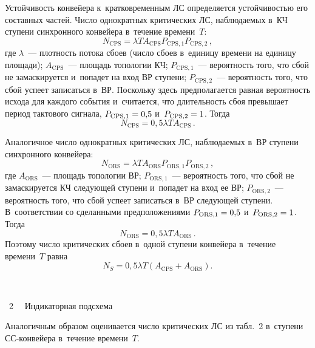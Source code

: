 \begin{multicols}{2}
  Устойчивость конвейера к~кратковременным ЛС определяется 
устойчивостью его составных частей. Число однократных критических ЛС, 
наблюдаемых в~КЧ ступени синхронного конвейера в~течение времени~$T$:
  $$
N_{\mathrm{CPS}} = \lambda T A_{\mathrm{CPS}} P_{\mathrm{CPS},1} P_{\mathrm{CPS},2}\,,
$$
где $\lambda$~--- плотность потока сбоев (число сбоев в~единицу времени на 
единицу площади); $A_{\mathrm{CPS}}$~--- площадь топологии КЧ; $P_{\mathrm{CPS},1}$~--- 
вероятность того, что сбой не замаскируется и~попадет на вход ВР ступени; 
$P_{\mathrm{CPS},2}$~--- вероятность того, что сбой успеет записаться в~ВР. Поскольку 
здесь предполагается равная вероятность исхода для каждого события 
и~считается, что длительность сбоя превышает период тактового сигнала, 
$P_{\mathrm{CPS},1}\hm = 0{,}5$ и~$P_{\mathrm{CPS},2}\hm = 1$. Тогда
$$
N_{\mathrm{CPS}} = 0{,}5\lambda TA_{\mathrm{CPS}}\,.
$$
  
  Аналогичное число однократных критических ЛС, наблюдаемых в~ВР 
ступени синхронного конвейера:
  $$
N_{\mathrm{ORS}} = \lambda TA_{\mathrm{ORS}}P_{\mathrm{ORS},1} P_{\mathrm{ORS},2}\,,
$$
где $A_{\mathrm{ORS}}$~--- площадь топологии ВР; $P_{\mathrm{ORS},1}$~--- вероятность того, что сбой 
не замаскируется КЧ следующей ступени и~попадет на вход ее ВР; $P_{\mathrm{ORS},2}$~--- 
вероятность того, что сбой успеет записаться в~ВР следующей ступени. 
В~соответствии со сделанными предположениями $P_{\mathrm{ORS},1}\hm= 0{,}5$ и~$P_{\mathrm{ORS},2}\hm = 1$. Тогда
$$
N_{\mathrm{ORS}} = 0{,}5\lambda TA_{\mathrm{ORS}}\,.
$$
%
  Поэтому  число критических сбоев в~одной ступени конвейера в~течение 
времени~$T$ равна 
$$
N_S = 0{,}5\lambda T\left(A_{\mathrm{CPS}} + A_{\mathrm{ORS}}\right).
$$


{ \begin{center}  %
 \vspace*{-1pt}
    \mbox{%
\epsfxsize=78.658mm
}

\vspace*{10pt}

\noindent
{{\figurename~2}\ \ \small{
Индикаторная подсхема
}}
\end{center}}

\vspace*{6pt}

\setcounter{figure}{1}

  

  Аналогичным образом оценивается  число  критических ЛС из табл.~2 
в~ступени СС-кон\-вей\-ера в~течение времени~$T$. 
  

\end{multicols}

